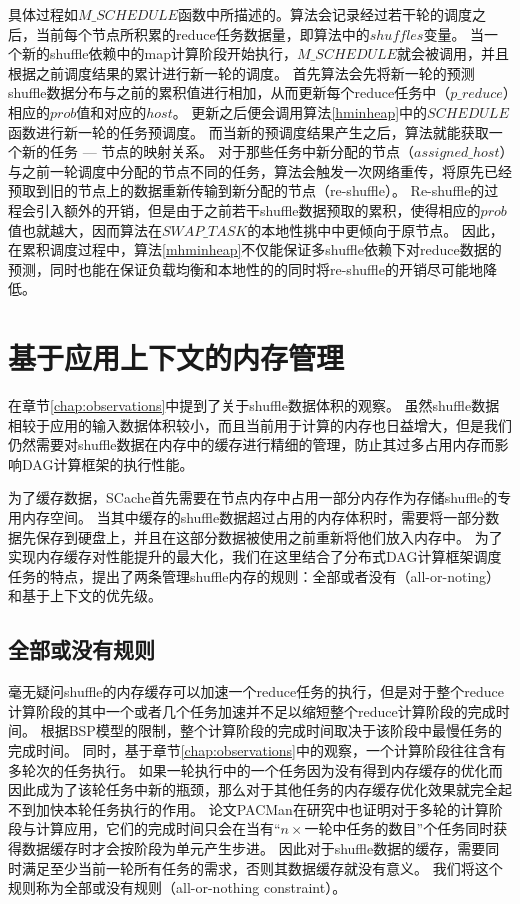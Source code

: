 具体过程如$M\_SCHEDULE$函数中所描述的。算法会记录经过若干轮的调度之后，当前每个节点所积累的reduce任务数据量，即算法中的$shuffles$变量。
当一个新的shuffle依赖中的map计算阶段开始执行，$M\_SCHEDULE$就会被调用，并且根据之前调度结果的累计进行新一轮的调度。
首先算法会先将新一轮的预测shuffle数据分布与之前的累积值进行相加，从而更新每个reduce任务中（$p\_reduce$）相应的$prob$值和对应的$host$。
更新之后便会调用算法\ref{hminheap}中的$SCHEDULE$函数进行新一轮的任务预调度。
而当新的预调度结果产生之后，算法就能获取一个新的任务 --- 节点的映射关系。
对于那些任务中新分配的节点（$assigned\_host$）与之前一轮调度中分配的节点不同的任务，算法会触发一次网络重传，将原先已经预取到旧的节点上的数据重新传输到新分配的节点（re-shuffle）。
Re-shuffle的过程会引入额外的开销，但是由于之前若干shuffle数据预取的累积，使得相应的$prob$值也就越大，因而算法在$SWAP\_TASK$的本地性挑中中更倾向于原节点。
因此，在累积调度过程中，算法\ref{mhminheap}不仅能保证多shuffle依赖下对reduce数据的预测，同时也能在保证负载均衡和本地性的的同时将re-shuffle的开销尽可能地降低。

\section{基于应用上下文的内存管理}

在章节\ref{chap:observations}中提到了关于shuffle数据体积的观察。
虽然shuffle数据相较于应用的输入数据体积较小，而且当前用于计算的内存也日益增大，但是我们仍然需要对shuffle数据在内存中的缓存进行精细的管理，防止其过多占用内存而影响DAG计算框架的执行性能。

为了缓存数据，SCache首先需要在节点内存中占用一部分内存作为存储shuffle的专用内存空间。
当其中缓存的shuffle数据超过占用的内存体积时，需要将一部分数据先保存到硬盘上，并且在这部分数据被使用之前重新将他们放入内存中。
为了实现内存缓存对性能提升的最大化，我们在这里结合了分布式DAG计算框架调度任务的特点，提出了两条管理shuffle内存的规则：全部或者没有（all-or-noting）和基于上下文的优先级。

\subsection{全部或没有规则}

毫无疑问shuffle的内存缓存可以加速一个reduce任务的执行，但是对于整个reduce计算阶段的其中一个或者几个任务加速并不足以缩短整个reduce计算阶段的完成时间。
根据BSP模型的限制，整个计算阶段的完成时间取决于该阶段中最慢任务的完成时间。
同时，基于章节\ref{chap:observations}中的观察，一个计算阶段往往含有多轮次的任务执行。
如果一轮执行中的一个任务因为没有得到内存缓存的优化而因此成为了该轮任务中新的瓶颈，那么对于其他任务的内存缓存优化效果就完全起不到加快本轮任务执行的作用。
论文PACMan\cite{pacman}在研究中也证明对于多轮的计算阶段与计算应用，它们的完成时间只会在当有“$n \times$一轮中任务的数目”个任务同时获得数据缓存时才会按阶段为单元产生步进。
因此对于shuffle数据的缓存，需要同时满足至少当前一轮所有任务的需求，否则其数据缓存就没有意义。
我们将这个规则称为全部或没有规则（all-or-nothing constraint）。

